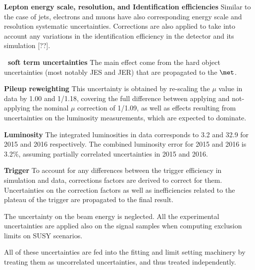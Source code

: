 \textbf{Lepton energy scale, resolution, and Identification efficiencies}
Similar to the case of jets, electrons and muons have also corresponding 
energy scale and resolution systematic uncertainties. Corrections are 
also applied to take into account any variations in the identification 
efficiency in the detector and its simulation [??].

\textbf{\met\ soft term uncertainties}
The main effect come from the hard object uncertainties (most notably JES and 
JER) that are propagated to the $\met$.

\textbf{Pileup reweighting}
This uncertainty is obtained by re-scaling the $\mu$ value in data by 1.00 and 1/1.18, 
covering the full difference between applying and not-applying the nominal $\mu$ correction of 1/1.09, 
as well as effects resulting from uncertainties on the luminosity measurements, which are expected to dominate.

\textbf{Luminosity}
The integrated luminosities in data corresponds to 3.2 \ifb and 32.9 \ifb 
for 2015 and 2016 respectively. The combined luminosity error for 2015 and 2016 is 3.2\%, assuming partially correlated uncertainties in 2015 and 2016.


\textbf{Trigger}
To account for any differences between the trigger efficiency in simulation 
and data, corrections factors are derived to correct for them. 
Uncertainties on the correction factors as well as inefficiencies 
related to the plateau of the trigger are propagated to the final result.

The uncertainty on the beam energy is neglected. 
All the experimental uncertainties are applied also on the signal samples when computing exclusion limits on SUSY scenarios. 


All of these uncertainties are fed into the fitting and limit setting 
machinery by treating them as uncorrelated uncertainties, and thus 
treated independently. 
